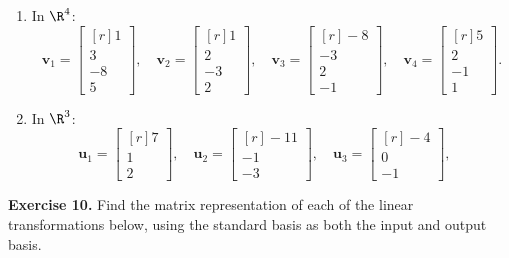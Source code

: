 \documentclass[12pt]{article}
\begin{document}
\begin{enumerate} 

\item In $\R^4$:
\[
\mathbf{v}_1=\begin{bmatrix*}[r] 1\\ 3\\ -8\\ 5\end{bmatrix*},\quad
\mathbf{v}_2=\begin{bmatrix*}[r] 1\\ 2\\ -3\\ 2\end{bmatrix*},\quad
\mathbf{v}_3=\begin{bmatrix*}[r] -8\\ -3\\ 2\\ -1\end{bmatrix*},\quad
\mathbf{v}_4=\begin{bmatrix*}[r] 5\\ 2\\ -1\\ 1\end{bmatrix*}.
\]

\item In $\R^3$:
\[
\mathbf{u}_1=\begin{bmatrix*}[r] 7\\ 1\\ 2\end{bmatrix*},\quad
\mathbf{u}_2=\begin{bmatrix*}[r] -11\\ -1\\ -3\end{bmatrix*},\quad
\mathbf{u}_3=\begin{bmatrix*}[r] -4\\ 0\\ -1\end{bmatrix*},\quad
\]

\end{enumerate}

\textbf{Exercise 10.} Find the matrix representation of each of the linear transformations below, using the standard basis as both the input and output basis.
\end{document}
